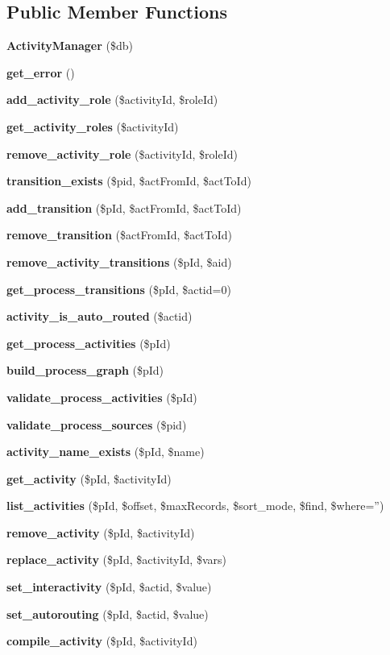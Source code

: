 \subsection*{Public Member Functions}
\begin{CompactItemize}
\item 
{\bf Activity\-Manager} (\$db)
\item 
{\bf get\_\-error} ()\label{classActivityManager_a1}

\item 
{\bf add\_\-activity\_\-role} (\$activity\-Id, \$role\-Id)
\item 
{\bf get\_\-activity\_\-roles} (\$activity\-Id)
\item 
{\bf remove\_\-activity\_\-role} (\$activity\-Id, \$role\-Id)
\item 
{\bf transition\_\-exists} (\$pid, \$act\-From\-Id, \$act\-To\-Id)
\item 
{\bf add\_\-transition} (\$p\-Id, \$act\-From\-Id, \$act\-To\-Id)
\item 
{\bf remove\_\-transition} (\$act\-From\-Id, \$act\-To\-Id)
\item 
{\bf remove\_\-activity\_\-transitions} (\$p\-Id, \$aid)
\item 
{\bf get\_\-process\_\-transitions} (\$p\-Id, \$actid=0)
\item 
{\bf activity\_\-is\_\-auto\_\-routed} (\$actid)
\item 
{\bf get\_\-process\_\-activities} (\$p\-Id)
\item 
{\bf build\_\-process\_\-graph} (\$p\-Id)
\item 
{\bf validate\_\-process\_\-activities} (\$p\-Id)
\item 
{\bf validate\_\-process\_\-sources} (\$pid)
\item 
{\bf activity\_\-name\_\-exists} (\$p\-Id, \$name)
\item 
{\bf get\_\-activity} (\$p\-Id, \$activity\-Id)
\item 
{\bf list\_\-activities} (\$p\-Id, \$offset, \$max\-Records, \$sort\_\-mode, \$find, \$where='')
\item 
{\bf remove\_\-activity} (\$p\-Id, \$activity\-Id)
\item 
{\bf replace\_\-activity} (\$p\-Id, \$activity\-Id, \$vars)
\item 
{\bf set\_\-interactivity} (\$p\-Id, \$actid, \$value)
\item 
{\bf set\_\-autorouting} (\$p\-Id, \$actid, \$value)
\item 
{\bf compile\_\-activity} (\$p\-Id, \$activity\-Id)
\end{CompactItemize}
